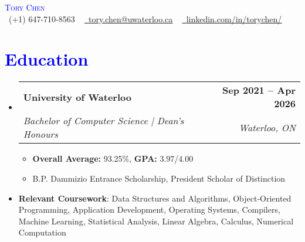\documentclass[letterpaper,11pt]{article}
\makeatletter
\newcommand{\resumeItem}[1]{
  \item\small{
    {#1 \vspace{-2pt}}
  }
}
\newcommand{\resumeSubheading}[4]{
  \vspace{-2pt}\item
    \begin{tabular*}{1.0\textwidth}[t]{l@{\extracolsep{\fill}}r}
      \textbf{#1} & \textbf{\small #2} \\
      \textit{\small#3} & \textit{\small #4} \\
    \end{tabular*}\vspace{-7pt}
}
\newcommand{\resumeSubItem}[1]{\resumeItem{#1}\vspace{-4pt}}
\newcommand{\resumeSubHeadingListStart}{\begin{itemize}[leftmargin=0.0in, label={}]}
\newcommand{\resumeSubHeadingListEnd}{\end{itemize}}
\makeatother
\begin{document}
\begin{center}
    \textcolor{Blue}{\Huge \scshape Tory Chen} \\ \vspace{1pt}
    \small \raisebox{-0.1\height}\faPhone\ (+1) 647-710-8563 ~ \href{mailto:tory.chen@uwaterloo.ca}{\raisebox{-0.2\height}\faEnvelope\  \underline{tory.chen@uwaterloo.ca}} ~ 
    \href{https://www.linkedin.com/in/torychen/}{\raisebox{-0.2\height}\faLinkedin\ \underline{linkedin.com/in/torychen/}}  ~
    \vspace{-8pt}
\end{center}


\section{\textcolor{Blue}{Education}}
  \resumeSubHeadingListStart
    \resumeSubheading
          {\textcolor{NavyBlue}{University of Waterloo}}{Sep 2021 -- Apr 2026}
      {Bachelor of Computer Science | Dean's Honours}{Waterloo, ON}
      \begin{itemize}
        \item\small \textbf{Overall Average:} 93.25\%, \textbf{GPA:} 3.97/4.00
        \item\small B.P. Dammizio Entrance Scholarship, President Scholar of Distinction
      \end{itemize}
  \resumeSubItem{}
    \textbf{\textcolor{NavyBlue}{Relevant Coursework}}{: Data Structures and Algorithms, Object‐Oriented Programming, Application Development, Operating Systems, Compilers, Machine Learning, Statistical Analysis, Linear Algebra, Calculus, Numerical Computation 
    } 
    \vspace{3pt}
  \resumeSubHeadingListEnd
  \vspace{-16pt}
\end{document}
